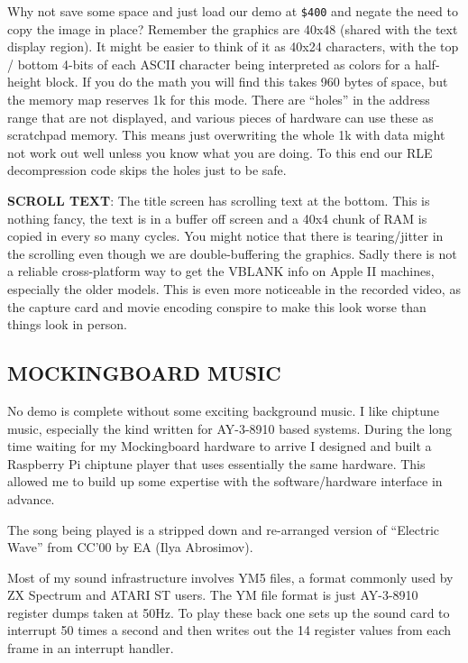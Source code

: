 \documentclass[twocolumn]{article}
\begin{document}
Why not save some space and just load our demo at {\tt \$400} and negate
the need
to copy the image in place?
Remember the graphics are 40x48 (shared with the text display region).
It might be easier to think of it as 40x24 characters, with the top / bottom
4-bits of each ASCII character being interpreted as colors for a half-height
block.
If you do the math you will find this takes 960 bytes of space, but the memory
map reserves 1k for this mode.
There are ``holes'' in the address range that are not displayed, and 
various pieces of hardware can use these as scratchpad memory.  
This means just overwriting the whole 1k with data might not work out well
unless you know what you are doing.
To this end our RLE decompression code skips the holes just to be safe.

\noindent
{\bf SCROLL TEXT}:
The title screen has scrolling text at the bottom.
This is nothing fancy, the text is in a buffer off screen and a 40x4 
chunk of RAM is copied in every so many cycles.
You might notice that there is tearing/jitter in the scrolling even
though we are double-buffering the graphics.  
Sadly there is not a reliable cross-platform way to get the VBLANK info 
on Apple II machines, especially the older models.
This is even more noticeable in the recorded video, as the capture card and
movie encoding conspire to make this look worse than things look in person.

\subsection{MOCKINGBOARD MUSIC}

No demo is complete without some exciting background music.
I like chiptune music, especially the kind written
for AY-3-8910 based systems.
During the long time waiting for my Mockingboard hardware to arrive
I designed and built a Raspberry Pi chiptune player that uses
essentially the same hardware.
This allowed me to build up some expertise with the software/hardware
interface in advance.

The song being played is a stripped down and re-arranged version of
``Electric Wave'' from CC'00 by EA (Ilya Abrosimov). 

Most of my sound infrastructure involves YM5 files, a format commonly
used by ZX Spectrum and ATARI ST users.
The YM file format is just AY-3-8910 register dumps taken at 50Hz.  
To play these back one sets up the sound card to interrupt 50 times a second
and then writes out the 14 register values from each frame in an interrupt
handler.
\end{document}
